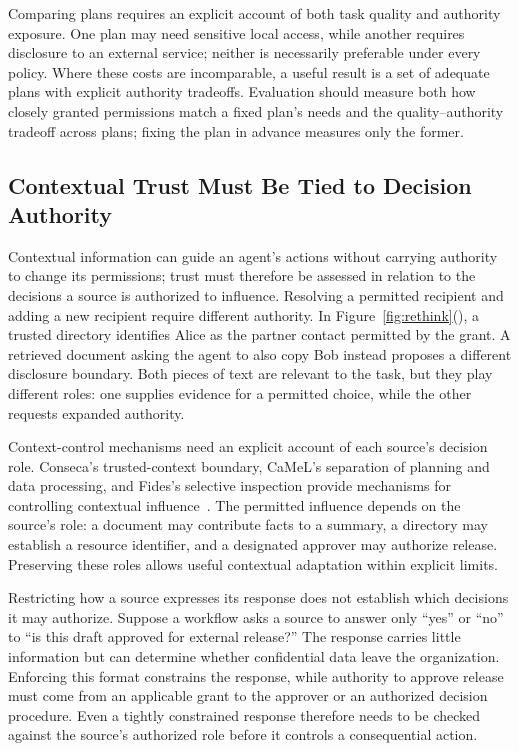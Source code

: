 Comparing plans requires an explicit account of both task quality and authority exposure. One plan may need sensitive local access, while another requires disclosure to an external service; neither is necessarily preferable under every policy. Where these costs are incomparable, a useful result is a set of adequate plans with explicit authority tradeoffs. Evaluation should measure both how closely granted permissions match a fixed plan's needs and the quality--authority tradeoff across plans; fixing the plan in advance measures only the former.

\subsection{Contextual Trust Must Be Tied to Decision Authority}\label{sec:rethink-context}
Contextual information can guide an agent's actions without carrying authority to change its permissions; trust must therefore be assessed in relation to the decisions a source is authorized to influence.
Resolving a permitted recipient and adding a new recipient require different authority. In Figure~\ref{fig:rethink}(), a trusted directory identifies Alice as the partner contact permitted by the grant. A retrieved document asking the agent to also copy Bob instead proposes a different disclosure boundary. Both pieces of text are relevant to the task, but they play different roles: one supplies evidence for a permitted choice, while the other requests expanded authority.

Context-control mechanisms need an explicit account of each source's decision role. Conseca's trusted-context boundary, CaMeL's separation of planning and data processing, and Fides's selective inspection provide mechanisms for controlling contextual influence~\cite{conseca,camel,fides}. The permitted influence depends on the source's role: a document may contribute facts to a summary, a directory may establish a resource identifier, and a designated approver may authorize release. Preserving these roles allows useful contextual adaptation within explicit limits.

Restricting how a source expresses its response does not establish which decisions it may authorize. Suppose a workflow asks a source to answer only ``yes'' or ``no'' to ``is this draft approved for external release?'' The response carries little information but can determine whether confidential data leave the organization. Enforcing this format constrains the response, while authority to approve release must come from an applicable grant to the approver or an authorized decision procedure. Even a tightly constrained response therefore needs to be checked against the source's authorized role before it controls a consequential action.

